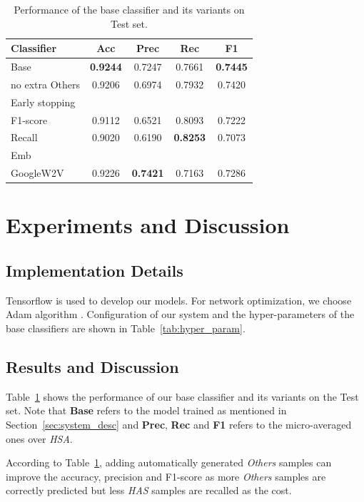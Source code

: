 \documentclass[11pt,a4paper]{article}
\begin{document}
\begin{table}\small
\begin{center}
\begin{tabular}{l|cccc}
\hline
\bf Classifier & \bf Acc & \bf Prec & \bf Rec & \bf F1 \\ 
\hline
Base  & \bf 0.9244 & 0.7247 & 0.7661 & \bf 0.7445 \\
\quad no extra Others & 0.9206 & 0.6974 & 0.7932 & 0.7420 \\
\hline
Early stopping & & & & \\
\quad F1-score & 0.9112 & 0.6521 & 0.8093 & 0.7222 \\
\quad Recall & 0.9020 & 0.6190 & \bf 0.8253 & 0.7073 \\
\hline
Emb \\
\quad GoogleW2V & 0.9226 & \bf 0.7421 & 0.7163 & 0.7286 \\
\hline
\end{tabular}
\end{center}
\caption{\label{tab:base_clfr} Performance of the base classifier and its variants on Test set.}
\end{table}

\section{Experiments and Discussion}
\label{sec:experiments}

\subsection{Implementation Details}

Tensorflow \cite{tensorflow} is used to develop our models. For network optimization, we choose Adam algorithm \cite{Kingma2014Adam}. Configuration of our system and the hyper-parameters of the base classifiers are shown in Table~\ref{tab:hyper_param}. 

\subsection{Results and Discussion}

Table~\ref{tab:base_clfr} shows the performance of our base classifier and its variants on the Test set. Note that {\bf Base} refers to the model trained as mentioned in Section~\ref{sec:system_desc} and {\bf Prec}, {\bf Rec} and {\bf F1} refers to the micro-averaged ones over {\em HSA}.

According to Table~\ref{tab:base_clfr}, adding automatically generated {\em Others} samples can improve the accuracy, precision and F1-score as more {\em Others} samples are correctly predicted but less {\em HAS} samples are recalled as the cost.
\end{document}
